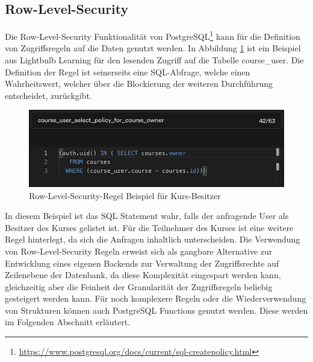 \subsection{Row-Level-Security}
Die Row-Level-Security Funktionalität von PostgreSQL\footnote{\url{https://www.postgresql.org/docs/current/sql-createpolicy.html}} kann für die Definition von Zugriffsregeln auf die Daten genutzt werden. In Abbildung \ref{fig:rls} ist ein Beispiel aus Lightbulb Learning für den lesenden Zugriff auf die Tabelle course\_user. Die Definition der Regel ist seinerseits eine SQL-Abfrage, welche einen Wahrheitswert, welcher über die Blockierung der weiteren Durchführung entscheidet, zurückgibt.
\begin{figure}[H]
    \centering
    \includegraphics[width = .8\textwidth]{images/prls.png}
    \caption{Row-Level-Security-Regel Beispiel für Kurs-Besitzer}
    \label{fig:rls}
\end{figure}
\noindent In diesem Beispiel ist das SQL Statement wahr, falls der anfragende User als Besitzer des Kurses gelistet ist. Für die Teilnehmer des Kurses ist eine weitere Regel hinterlegt, da sich die Anfragen inhaltlich unterscheiden. Die Verwendung von Row-Level-Security Regeln erweist sich als gangbare Alternative zur Entwicklung eines eigenen Backends zur Verwaltung der Zugriffsrechte auf Zeilenebene der Datenbank, da diese Komplexität eingespart werden kann, gleichzeitig aber die Feinheit der Granularität der Zugriffsregeln beliebig gesteigert werden kann. Für noch komplexere Regeln oder die Wiederverwendung von Strukturen können auch PostgreSQL Functions genutzt werden. Diese werden im Folgenden Abschnitt erläutert.
